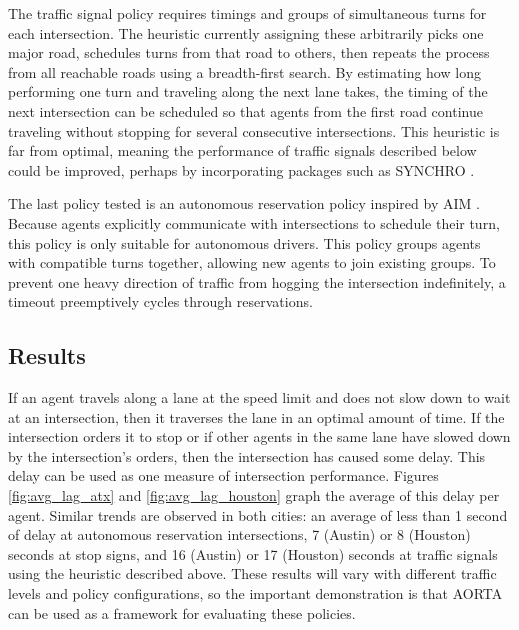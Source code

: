 \documentclass[letterpaper, 10 pt, conference]{ieeeconf}  %
\begin{document}
The traffic signal policy requires timings and groups of simultaneous turns for
each intersection. The heuristic currently assigning these arbitrarily picks one
major road, schedules turns from that road to others, then repeats the process
from all reachable roads using a breadth-first search. By estimating how long
performing one turn and traveling along the next lane takes, the timing of the
next intersection can be scheduled so that agents from the first road continue
traveling without stopping for several consecutive intersections. This heuristic
is far from optimal, meaning the performance of traffic signals described below
could be improved, perhaps by incorporating packages such as SYNCHRO
\cite{synchro}.

The last policy tested is an autonomous reservation policy inspired by AIM
\cite{JAIR08-dresner}. Because agents explicitly communicate with intersections
to schedule their turn, this policy is only suitable for autonomous drivers.
This policy groups agents with compatible turns together, allowing new agents to
join existing groups. To prevent one heavy direction of traffic from hogging the
intersection indefinitely, a timeout preemptively cycles through reservations.

\subsection{Results}

If an agent travels along a lane at the speed limit and does not slow down to
wait at an intersection, then it traverses the lane in an optimal amount of
time. If the intersection orders it to stop or if other agents in the same lane
have slowed down by the intersection's orders, then the intersection has caused
some delay. This delay can be used as one measure of intersection performance.
Figures \ref{fig:avg_lag_atx} and \ref{fig:avg_lag_houston} graph the average of
this delay per agent. Similar trends are observed in both cities: an average of
less than 1 second of delay at autonomous reservation intersections, 7 (Austin)
or 8 (Houston) seconds at stop signs, and 16 (Austin) or 17 (Houston) seconds at
traffic signals using the heuristic described above.  These results will vary
with different traffic levels and policy configurations, so the important
demonstration is that AORTA can be used as a framework for evaluating these
policies.
\end{document}
